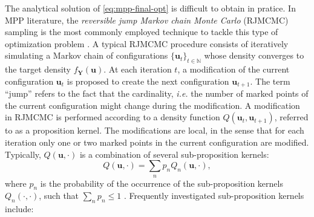 \documentclass[journal]{IEEEtran}
\begin{document}
The analytical solution of \eqref{eq:mpp-final-opt} is difficult to
obtain in pratice. In MPP literature, the \textit{reversible jump
  Markov chain Monte Carlo} (RJMCMC) sampling is the most commonly
employed technique to tackle this type of optimization problem
\cite{geyer1994simulation} \cite{green1995reversible}
\cite{tu2002image} \cite{descombes2009object} \cite{ge2009marked}
\cite{lafarge2010geometric} \cite{utasi20113}
\cite{sirinukunwattana2015stochastic}. A typical RJMCMC procedure
consists of iteratively simulating a Markov chain of configurations
$\{ \mathbf{u}_t \}_{t \in \mathbb{N}}$ whose density converges to the
target density $f_{\mathbf{Y}}(\mathbf{u})$. At each iteration $t$, a
modification of the current configuration $\mathbf{u}_t$ is proposed
to create the next configuration $\mathbf{u}_{t+1}$. The term ``jump''
refers to the fact that the cardinality, \textit{i.e.} the number of
marked points of the current configuration might change during the
modification. A modification in RJMCMC is performed according to a
density function $Q(\mathbf{u}_t, \mathbf{u}_{t+1})$, referred to as a
proposition kernel. The modifications are local, in the sense that for
each iteration only one or two marked points in the current
configuration are modified. Typically, $Q(\mathbf{u}, \cdot)$ is a
combination of several sub-proposition kernels:
\begin{equation}
  \label{eq:sub-kernels}
  Q(\mathbf{u}, \cdot) = \sum_n p_n Q_n (\mathbf{u}, \cdot),
\end{equation}
where $p_n$ is the probability of the occurrence of the
sub-proposition kernels $Q_n(\cdot, \cdot)$, such that
$\sum_n p_n \le 1$ \cite{descombes2013stochastic}
\cite{verdie2014detecting}. Frequently investigated sub-proposition
kernels include:
\end{document}

